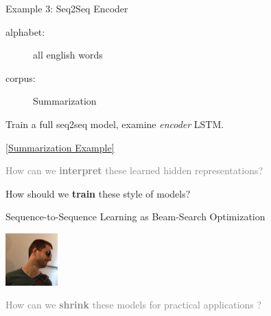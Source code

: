 \documentclass{beamer}
\let\tempone\itemize
\let\temptwo\enditemize
\renewenvironment{itemize}{\tempone\addtolength{\itemsep}{0.5\baselineskip}}{\temptwo}
\newcommand{\air}{\vspace{0.25cm}}
\newcommand{\Cite}[1]{{\footnotesize \citep{#1}}}
\begin{document}
\begin{frame}
  \centerline{\alert{Example 3}: Seq2Seq Encoder}
  \air

  \begin{description}
  \item[alphabet:] all english words
  \item[corpus:]  Summarization
  \end{description}

  \begin{itemize}

  \item Train a full seq2seq model, examine \textit{encoder} LSTM.
  
  \end{itemize}


\air
  \centerline{ \href{http://lstm.seas.harvard.edu/client/pattern_finder.html?data_set=20autoencoder&source=states::states2&pos=100}{[Summarization Example]}}
\end{frame}
\begin{frame}
  \centerline{}
  \air 
  \air

  \begin{itemize}
  \item \textcolor{gray}{How can we \textbf{interpret} these learned hidden representations? \Cite{Strobelt2016}}
    \air 
  \item  How should we \textbf{train} these style of models? 
    \air 

    \begin{center}
      \alert{Sequence-to-Sequence Learning as Beam-Search
        Optimization}
     
      \Cite{Wiseman2016a}

      \includegraphics[width=2cm]{sam}
    \end{center}


    \air 
  \item \textcolor{gray}{ How can we \textbf{shrink} these models for practical applications \Cite{Kim2016a}? }
  \end{itemize}
\end{frame}
\end{document}
